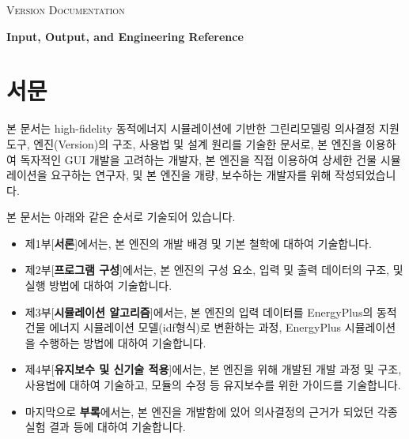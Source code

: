 \documentclass[oneside,openany,a4paper,12pt]{book}
\begin{document}
\pagestyle{plain} 


\begin{titlepage}
  \centering
  {\scshape\large \simulator Version \releaseversion Documentation\par}
  \vspace{6em}
  {\bfseries\Huge Input, Output, and Engineering Reference\par}
  \vspace{1em}
  \vfill
  {\large \releasedate \par}
\end{titlepage}

\section*{서문}
본 문서는 high-fidelity 동적에너지 시뮬레이션에 기반한 그린리모델링 의사결정 지원 도구, \simulator 엔진(Version\releaseversion)의 구조, 사용법 및 설계 원리를 기술한 문서로, 본 엔진을 이용하여 독자적인 GUI 개발을 고려하는 개발자, 본 엔진을 직접 이용하여 상세한 건물 시뮬레이션을 요구하는 연구자, 및 본 엔진을 개량, 보수하는 개발자를 위해 작성되었습니다.

본 문서는 아래와 같은 순서로 기술되어 있습니다.
\begin{itemize}
  \item 제1부[{\bfseries 서론}]에서는, 본 엔진의 개발 배경 및 기본 철학에 대하여 기술합니다.
  \item 제2부[{\bfseries 프로그램 구성}]에서는, 본 엔진의 구성 요소, 입력 및 출력 데이터의 구조, 및 실행 방법에 대하여 기술합니다.
  \item 제3부[{\bfseries 시뮬레이션 알고리즘}]에서는, 본 엔진의 입력 데이터를 EnergyPlus의 동적 건물 에너지 시뮬레이션 모델(idf형식)로 변환하는 과정, EnergyPlus 시뮬레이션을 수행하는 방법에 대하여 기술합니다.
  \item 제4부[{\bfseries 유지보수 및 신기술 적용}]에서는, 본 엔진을 위해 개발된  개발 과정 및 구조, 사용법에 대하여 기술하고, 모듈의 수정 등 유지보수를 위한 가이드를 기술합니다.
  \item 마지막으로 {\bfseries 부록}에서는, 본 엔진을 개발함에 있어 의사결정의 근거가 되었던 각종 실험 결과 등에 대하여 기술합니다.
\end{itemize}
\end{document}
